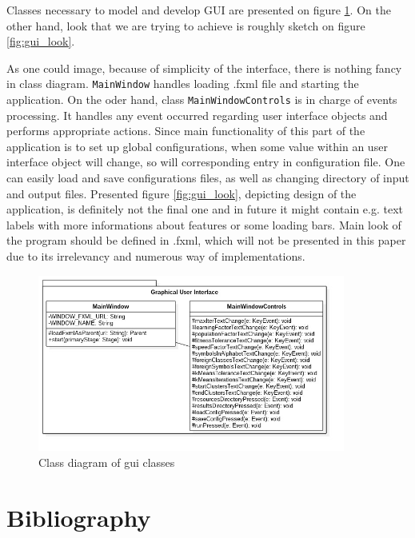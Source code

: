 \documentclass{article}
\begin{document}
Classes necessary to model and develop GUI are presented on figure \ref{fig:gui_classes}. On the other hand, look that we are trying to achieve is roughly sketch on figure \ref{fig:gui_look}.

As one could image, because of simplicity of the interface, there is nothing fancy in class diagram. \texttt{MainWindow} handles loading .fxml file and starting the application. On the oder hand, class \texttt{MainWindowControls} is in charge of events processing. It handles any event occurred regarding user interface objects and performs appropriate actions. Since main functionality of this part of the application is to set up global configurations, when some value within an user interface object will change, so will corresponding entry in configuration file. One can easily load and save configurations files, as well as changing directory of input and output files. Presented figure \ref{fig:gui_look}, depicting design of the application, is definitely not the final one and in future it might contain e.g. text labels with more informations about features or some loading bars. Main look of the program should be defined in .fxml, which will not be presented in this paper due to its irrelevancy and numerous way of implementations. 

\begin{figure}[H]
	\centering
	\includegraphics[width=0.9\textwidth]{images/gui.jpg}
    \caption{Class diagram of gui classes}
    \label{fig:gui_classes}
\end{figure}




\section{Bibliography}
\end{document}
